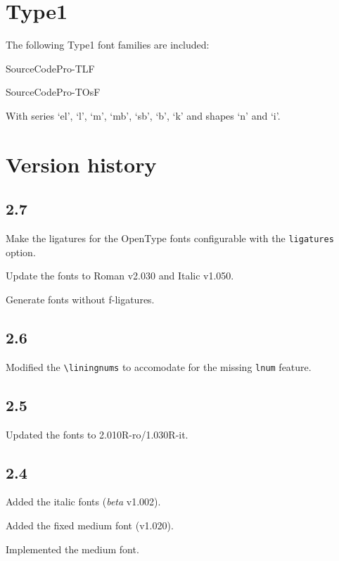 \documentclass[10pt,a4paper,english]{article}
\begin{document}
\begin{multicols}{2}
\section{Type1}
The following Type1 font families are included:
\begin{itemize*}
	\item SourceCodePro-TLF
	\item SourceCodePro-TOsF
\end{itemize*}
With series ‘el’, ‘l’, ‘m’, ‘mb’, ‘sb’, ‘b’, ‘k’ and shapes ‘n’ and ‘i’.

\section{Version history}
\subsection*{2.7}
\begin{itemize*}
	\item Make the ligatures for the OpenType fonts configurable with the \texttt{ligatures} option.
	\item Update the fonts to Roman v2.030 and Italic v1.050.
	\item Generate fonts without f-ligatures.
\end{itemize*}

\subsection*{2.6}
\begin{itemize*}
	\item Modified the \texttt{\textbackslash liningnums} to accomodate for the missing \texttt{lnum} feature.
\end{itemize*}

\subsection*{2.5}
\begin{itemize*}
	\item Updated the fonts to 2.010R-ro/1.030R-it.
\end{itemize*}

\subsection*{2.4}
\begin{itemize*}
	\item Added the italic fonts (\emph{beta} v1.002).
	\item Added the fixed medium font (v1.020).
	\item Implemented the medium font.
\end{itemize*}


\end{multicols}
\end{document}
